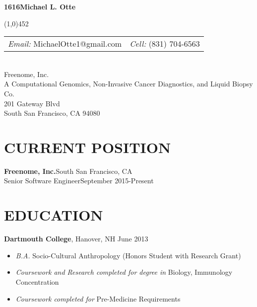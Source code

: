 \documentclass[a4paper, 12pt]{article}
\makeatletter
\newcommand\header{\@setfontsize\Huge{16}{16}} %
\makeatother
\begin{document}
\thispagestyle{empty}

\pagestyle{fancy}

\noindent
\textbf{\header Michael L. Otte}
\vspace{-3mm}

\noindent
\line(1,0){452}\\[1mm]
\begin{tabular}{ |p{2.9in}|p{3.75in}| }
{\sl Email:} MichaelOtte1@gmail.com & {\sl Cell:} (831) 704-6563 \\[3mm]
\end{tabular}\\[-3mm]

\noindent Freenome, Inc.\\
A Computational Genomics, Non-Invasive Cancer Diagnostics, and Liquid Biopsy Co.\\
201 Gateway Blvd\\
South San Francisco, CA 94080

\section*{CURRENT POSITION}
\vspace{-3mm}
{\bf Freenome, Inc.}\hfill South San Francisco, CA\\
Senior Software Engineer\hfill September 2015-Present

\section*{EDUCATION}
\vspace{-3mm}
{\bf Dartmouth College}, Hanover, NH \hfill June 2013 \\[-7mm]
\begin{itemize}[leftmargin=5mm] 
\itemsep -1mm
	\item[] {\sl B.A.} {Socio-Cultural Anthropology (Honors Student with Research Grant)}
	\item[] {\sl Coursework and Research completed for degree in} {Biology, Immunology Concentration}
	\item[] {\sl Coursework completed for} {Pre-Medicine Requirements}
\end{itemize}
\end{document}
